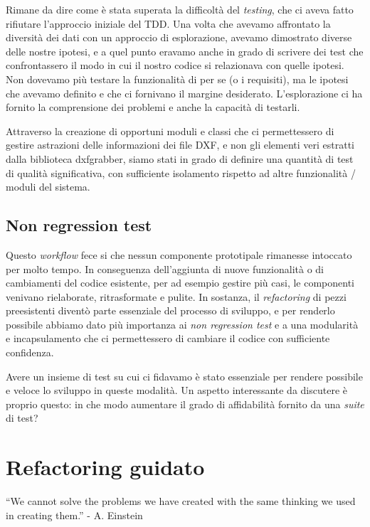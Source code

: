 \documentclass[12pt]{report}
\begin{document}
Rimane da dire come è stata superata la difficoltà del \textit{testing}, che ci aveva fatto rifiutare l'approccio iniziale del TDD. Una volta che avevamo affrontato la diversità dei dati con un approccio di esplorazione, avevamo dimostrato diverse delle nostre ipotesi, e a quel punto eravamo anche in grado di scrivere dei test che confrontassero il modo in cui il nostro codice si relazionava con quelle ipotesi. Non dovevamo più testare la funzionalità di per se (o i requisiti), ma le ipotesi che avevamo definito e che ci fornivano il margine desiderato. L'esplorazione ci ha fornito la comprensione dei problemi e anche la capacità di testarli.

Attraverso la creazione di opportuni moduli e classi che ci permettessero di gestire astrazioni delle informazioni dei file DXF, e non gli elementi veri estratti dalla biblioteca dxfgrabber, siamo stati in grado di definire una quantità di test di qualità significativa, con sufficiente isolamento rispetto ad altre funzionalità / moduli del sistema.

\section{Non regression test}

Questo \textit{workflow} fece si che nessun componente prototipale rimanesse intoccato per molto tempo. In conseguenza dell'aggiunta di nuove funzionalità o di cambiamenti del codice esistente, per ad esempio gestire più casi, le componenti venivano rielaborate, ritrasformate e pulite. In sostanza, il \textit{refactoring} di pezzi preesistenti diventò parte essenziale del processo di sviluppo, e per renderlo possibile abbiamo dato più importanza ai \textit{non regression test} e a una modularità e incapsulamento che ci permettessero di cambiare il codice con sufficiente confidenza. 

Avere un insieme di test su cui ci fidavamo è stato essenziale per rendere possibile e veloce lo sviluppo in queste modalità. Un aspetto interessante da discutere è proprio questo: in che modo aumentare il grado di affidabilità fornito da una \textit{suite} di test?



% 
\chapter{Refactoring guidato}

``We cannot solve the problems we have created
with the same thinking we used in creating them.'' - A. Einstein
\end{document}
